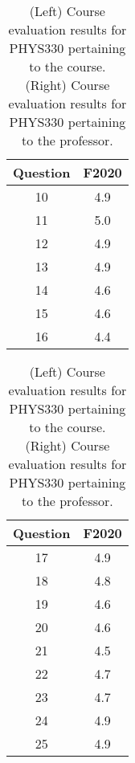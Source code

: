 \documentclass[../../main.tex]{subfiles}
\begin{document}
\begin{table}
\footnotesize
\centering
\begin{tabular}{| c | c |}
\hline
\hline
Question & F2020 \\ \hline
10 & 4.9 \\ \hline
11 & 5.0 \\ \hline
12 & 4.9 \\ \hline
13 & 4.9 \\ \hline
14 & 4.6 \\ \hline
15 & 4.6 \\ \hline
16 & 4.4 \\ \hline
\hline
\end{tabular}
\begin{tabular}{| c | c |}
\hline
\hline
Question & F2020 \\ \hline
17 & 4.9 \\ \hline
18 & 4.8 \\ \hline
19 & 4.6 \\ \hline
20 & 4.6 \\ \hline
21 & 4.5 \\ \hline
22 & 4.7 \\ \hline
23 & 4.7 \\ \hline
24 & 4.9 \\ \hline
25 & 4.9 \\ \hline
\hline
\end{tabular}
\caption{\label{tab:eval_330} (Left) Course evaluation results for PHYS330 pertaining to the course.  (Right) Course evaluation results for PHYS330 pertaining to the professor.}
\end{table}
\end{document}
